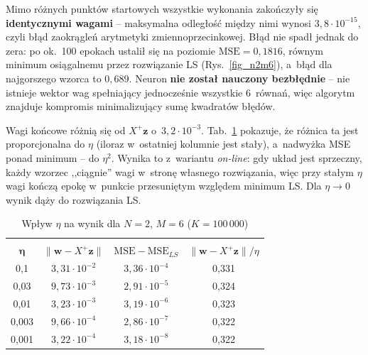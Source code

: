 \documentclass[12pt]{article}
\begin{document}
\noindent Mimo różnych punktów startowych wszystkie wykonania zakończyły się
\textbf{identycznymi wagami} -- maksymalna odległość między nimi wynosi
$3{,}8\cdot10^{-15}$, czyli błąd zaokrągleń arytmetyki zmiennoprzecinkowej.
Błąd nie spadł jednak do zera: po ok.~100 epokach ustalił się na poziomie
$\mathrm{MSE}=0{,}1816$, równym minimum osiągalnemu przez rozwiązanie LS
(Rys.~\ref{fig_n2m6}), a~błąd dla najgorszego wzorca to $0{,}689$.
Neuron \textbf{nie został nauczony bezbłędnie} -- nie istnieje wektor wag
spełniający jednocześnie wszystkie 6~równań, więc algorytm znajduje
kompromis minimalizujący sumę kwadratów błędów.

Wagi końcowe różnią się od $X^{+}\mathbf{z}$ o~$3{,}2\cdot10^{-3}$. Tab.~\ref{tab_eta}
pokazuje, że różnica ta jest proporcjonalna do $\eta$ (iloraz w~ostatniej kolumnie
jest stały), a~nadwyżka MSE ponad minimum -- do $\eta^2$. Wynika to z~wariantu
\textit{on-line}: gdy układ jest sprzeczny, każdy wzorzec ,,ciągnie'' wagi
w~stronę własnego rozwiązania, więc przy stałym $\eta$ wagi kończą epokę
w~punkcie przesuniętym względem minimum LS. Dla $\eta\to0$ wynik dąży do rozwiązania LS.

\begin{table}[h!]
 \caption{Wpływ $\eta$ na wynik dla $N=2$, $M=6$ ($K=100\,000$)}
 \centering
 \vspace{0.2cm}
 \begin{tabular}{c c c c}
  \hline\hline\\[-0.4cm]
  $\boldsymbol{\eta}$ & $\|\mathbf{w}-X^{+}\mathbf{z}\|$ & $\mathrm{MSE}-\mathrm{MSE}_{LS}$ & $\|\mathbf{w}-X^{+}\mathbf{z}\|/\eta$\\[0.1cm]
  \hline
  0,1 & $3{,}31\cdot 10^{-2}$ & $3{,}36\cdot 10^{-4}$ & 0,331 \\
  0,03 & $9{,}73\cdot 10^{-3}$ & $2{,}91\cdot 10^{-5}$ & 0,324 \\
  0,01 & $3{,}23\cdot 10^{-3}$ & $3{,}19\cdot 10^{-6}$ & 0,323 \\
  0,003 & $9{,}66\cdot 10^{-4}$ & $2{,}86\cdot 10^{-7}$ & 0,322 \\
  0,001 & $3{,}22\cdot 10^{-4}$ & $3{,}18\cdot 10^{-8}$ & 0,322 \\
  \hline
 \end{tabular}
 \label{tab_eta}
\end{table}

\end{document}
